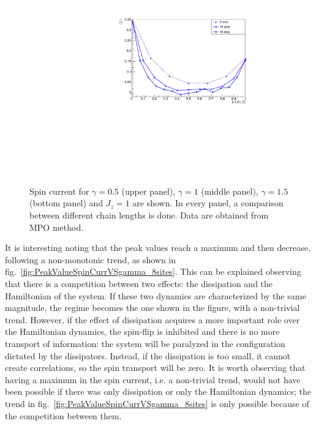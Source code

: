 \begin{figure}[H]
\begin{subfigure}{\columnwidth}
    \label{fig:12sites_LMvsGamma}
\end{subfigure}\\
\begin{subfigure}{\columnwidth}
\centering
    \includegraphics[scale=0.6]{Figures/spinCurrVSsize_Gamma15.pdf}
    \label{fig:16sites_LMvsGamma}
\end{subfigure}\\
\captionsetup{width=1.\linewidth}
\caption{Spin current for $\gamma = 0.5$ (upper panel), $\gamma = 1$ (middle panel), $\gamma = 1.5$ (bottom panel) and $J_z = 1$ are shown. In every panel, a comparison between different chain lengths is done. Data are obtained from MPO method.}
\label{fig:spinCurrVSsizeVSgamma}
\end{figure}

It is interesting noting that the peak values reach a maximum and then decrease, following a non-monotonic trend, as shown in fig.~\ref{fig:PeakValueSpinCurrVSgamma_8sites}. This can be explained observing that there is a competition between two effects: the dissipation and the Hamiltonian of the system. If these two dynamics are characterized by the same magnitude, the regime becomes the one shown in the figure, with a non-trivial trend. However, if the effect of dissipation acquires a more important role over the Hamiltonian dynamics, the spin-flip is inhibited and there is no more transport of information: the system will be paralyzed in the configuration dictated by the dissipators. Instead, if the dissipation is too small, it cannot create correlations, so the spin transport will be zero. It is worth observing that having a maximum in the spin current, i.e. a non-trivial trend, would not have been possible if there was only dissipation or only the Hamiltonian dynamics; the trend in fig.~\ref{fig:PeakValueSpinCurrVSgamma_8sites} is only possible because of the competition between them.

